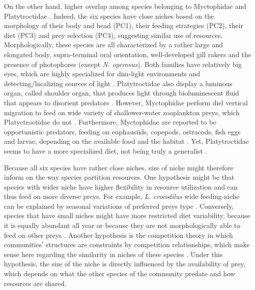 On the other hand, higher overlap among species belonging to Myctophidae and Platytroctidae . Indeed, the six species have close niches based on the morphology of their body and head (PC1), their feeding strategies (PC2), their diet (PC3) and prey selection (PC4), suggesting similar use of resources. Morphologically, these species are all characterized by a rather large and elongated body, supra-terminal oral orientation, well-developed gill rakers and the presence of photophores (except \textit{N. operosus}). Both families have relatively big eyes, which are highly specialized for dim-light environments and detecting/localizing sources of light \citep{debusserolles2014,novotny2018}. Platytroctidae also display a luminous organ, called shoulder organ, that produces light through bioluminescent fluid that appears to disorient predators \citep{novotny2018}. However, Myctophidae perform diel vertical migration to feed on wide variety of shallower-water zooplankton preys, which Platyctroctidae do not \citep{sutton2013a}. Furthermore, Myctophidae are reported to be opportunistic predators, feeding on euphausiids, copepods, ostracods, fish eggs and larvae, depending on the available food and the habitat \citet{catul2011,kozlov1995}. Yet, Platytroctidae seems to have a more specialized diet, not being truly a generalist \citet{novotny2018}. 

Because all six species have rather close niches, size of niche might therefore inform on the way species partition resources. One hypothesis might be that species with wider niche have higher flexibility in resource utilization and can thus feed on more diverse preys. For example, \textit{L. crocodilus} wide feeding-niche can be explained by seasonal variations of preferred preys type \citet{fanelli2014}. Conversely, species that have small niches might have more restricted diet variability, because it is equally abundant all year or because they are not morphologically able to feed on other preys \citep{mejri2009}. Another hypothesis is the competition theory in which communities' structures are constraints by competition relationships, which make sense here regarding the similarity in niches of these species \citep{geange2011}. Under this hypothesis, the size of the niche is directly influenced by the availability of prey, which depends on what the other species of the community predate and how resources are shared.

